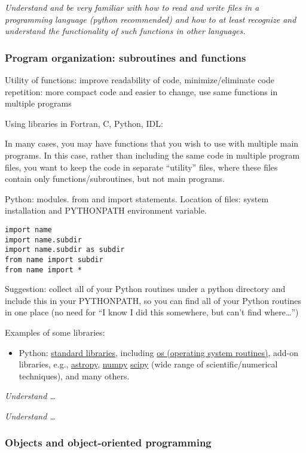 \documentclass{article}
\newcommand{\test}[1]{%
    \begin{center}
        \colorbox{hl}{\parbox{0.9\textwidth}{\emph{#1}}}
    \end{center}}
\begin{document}
\test{Understand and be very familiar with how to read and write files
in a programming language (python recommended) and how to at least
recognize and understand the functionality of such functions in other
languages.}
\subsubsection{Program organization: subroutines and functions}
Utility of functions:
    improve readability of code,
    minimize/eliminate code repetition: more compact code and easier to
    change,
    use same functions in multiple programs

Using libraries in Fortran, C, Python, IDL:

In many cases, you may have functions that you wish to use with
multiple main programs. In this case, rather than including the same
code in multiple program files, you want to keep the code in separate
``utility'' files, where these files contain only
functions/subroutines, but not main programs.

Python: modules. from and import statements. Location of files: system
installation and PYTHONPATH environment variable.
\begin{verbatim}
import name
import name.subdir
import name.subdir as subdir
from name import subdir
from name import *
\end{verbatim}
Suggestion: collect all of your Python routines under a python
directory and include this in your PYTHONPATH, so you can find all of
your Python routines in one place (no need for ``I know I did this
somewhere, but can't find where\ldots'')

Examples of some libraries:
\begin{itemize}
    \item Python:
        \href{https://docs.python.org/2/library/index.html}
        {standard libraries}, including
        \href{https://docs.python.org/2/library/os.html}
        {os (operating system routines)}, add-on libraries, e.g.,
        \href{http://www.astropy.org}
        {astropy},
        \href{http://www.numpy.org}
        {numpy}
        \href{http://www.scipy.org}
        {scipy} (wide range of scientific/numerical techniques), and
        many others.
\end{itemize}

\test{Understand \ldots}

\test{Understand \ldots}

\subsubsection{Objects and object-oriented programming}
\end{document}
